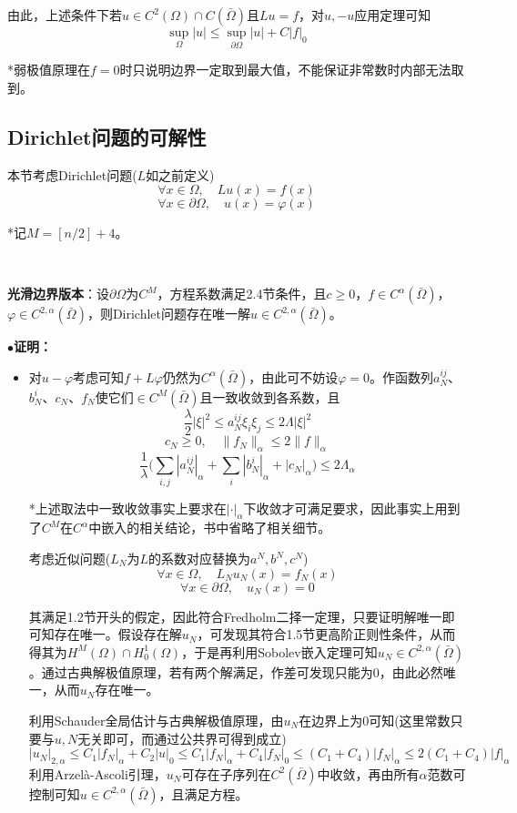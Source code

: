 \documentclass[a4paper,UTF8,fontset=windows,AutoFakeBold]{ctexart}
\newcommand{\proo}[1]{{\kaishu $\bullet$\textbf{证明：}
\begin{itemize}
    \item[] #1
\end{itemize}
}}
\begin{document}
由此，上述条件下若$u\in C^2(\Omega)\cap C(\bar\Omega)$且$Lu=f$，对$u,-u$应用定理可知
$$\sup_\Omega|u|\le\sup_{\partial\Omega}|u|+C|f|_0$$

*弱极值原理在$f=0$时只说明边界一定取到最大值，不能保证非常数时内部无法取到。

\subsection{Dirichlet问题的可解性}
本节考虑Dirichlet问题($L$如之前定义)
$$\forall x\in\Omega,\quad Lu(x)=f(x)$$
$$\forall x\in\partial\Omega,\quad u(x)=\varphi(x)$$

*记$M=[n/2]+4$。

\

\textbf{光滑边界版本}：设$\partial\Omega$为$C^M$，方程系数满足2.4节条件，且$c\ge0$，$f\in C^\alpha(\bar\Omega)$，$\varphi\in C^{2,\alpha}(\bar\Omega)$，则Dirichlet问题存在唯一解$u\in C^{2,\alpha}(\bar\Omega)$。

\proo{
    对$u-\varphi$考虑可知$f+L\varphi$仍然为$C^\alpha(\bar\Omega)$，由此可不妨设$\varphi=0$。作函数列$a_N^{ij}$、$b_N^i$、$c_N$、$f_N$使它们$\in C^M(\bar\Omega)$且一致收敛到各系数，且
    $$\frac{\lambda}{2}|\xi|^2\le a_N^{ij}\xi_i\xi_j\le2\Lambda|\xi|^2$$
    $$c_N\ge0,\quad\|f_N\|_\alpha\le2\|f\|_\alpha$$
    $$\frac{1}{\lambda}\bigg(\sum_{i,j}|a_N^{ij}|_\alpha+\sum_i|b_N^i|_\alpha+|c_N|_\alpha\bigg)\le 2\Lambda_\alpha$$

    *上述取法中一致收敛事实上要求在$|\cdot|_\alpha$下收敛才可满足要求，因此事实上用到了$C^M$在$C^\alpha$中嵌入的相关结论，书中省略了相关细节。

    考虑近似问题($L_N$为$L$的系数对应替换为$a^N,b^N,c^N$)
    $$\forall x\in\Omega,\quad L_Nu_N(x)=f_N(x)$$
    $$\forall x\in\partial\Omega,\quad u_N(x)=0$$

    其满足1.2节开头的假定，因此符合Fredholm二择一定理，只要证明解唯一即可知存在唯一。假设存在解$u_N$，可发现其符合1.5节更高阶正则性条件，从而得其为$H^M(\Omega)\cap H_0^1(\Omega)$，于是再利用Sobolev嵌入定理可知$u_N\in C^{2,\alpha}(\bar\Omega)$。通过古典解极值原理，若有两个解满足，作差可发现只能为0，由此必然唯一，从而$u_N$存在唯一。
    
    利用Schauder全局估计与古典解极值原理，由$u_N$在边界上为0可知(这里常数只要与$u,N$无关即可，而通过公共界可得到成立)
    $$|u_N|_{2,\alpha}\le C_1|f_N|_\alpha+C_2|u|_0\le C_1|f_N|_\alpha+C_4|f_N|_0\le(C_1+C_4)|f_N|_\alpha\le 2(C_1+C_4)|f|_\alpha$$
    利用Arzel\`a-Ascoli引理，$u_N$可存在子序列在$C^2(\bar\Omega)$中收敛，再由所有$\alpha$范数可控制可知$u\in C^{2,\alpha}(\bar\Omega)$，且满足方程。    
}
\end{document}
